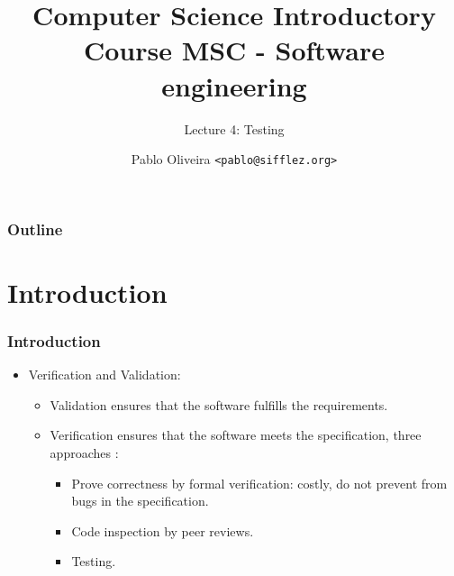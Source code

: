 \documentclass[10pt]{beamer}
\title{Computer Science Introductory Course MSC - Software engineering}
\subtitle{Lecture 4: Testing}
\author[Pablo Oliveira]{Pablo Oliveira \texttt{<pablo@sifflez.org>}}
\institute{ENST}
\date{}
\begin{document}
\begin{frame}
  \titlepage
\end{frame}

\begin{frame}
  \frametitle{Outline}
  \tableofcontents
\end{frame}

\section{Introduction}
\begin{frame}
\frametitle{Introduction}
\begin{itemize}
  \item Verification and Validation:
    \begin{itemize}
    \item Validation ensures that the software fulfills the requirements.
    \item \alert{Verification} ensures that the software meets the
      specification, three approaches :
      \begin{itemize}
      \item Prove correctness by formal verification: costly, do not prevent
        from bugs in the specification.
      \item Code inspection by peer reviews.
      \item \alert{Testing}.
      \end{itemize}
    \end{itemize}
\end{itemize}
\end{frame}
\end{document}

